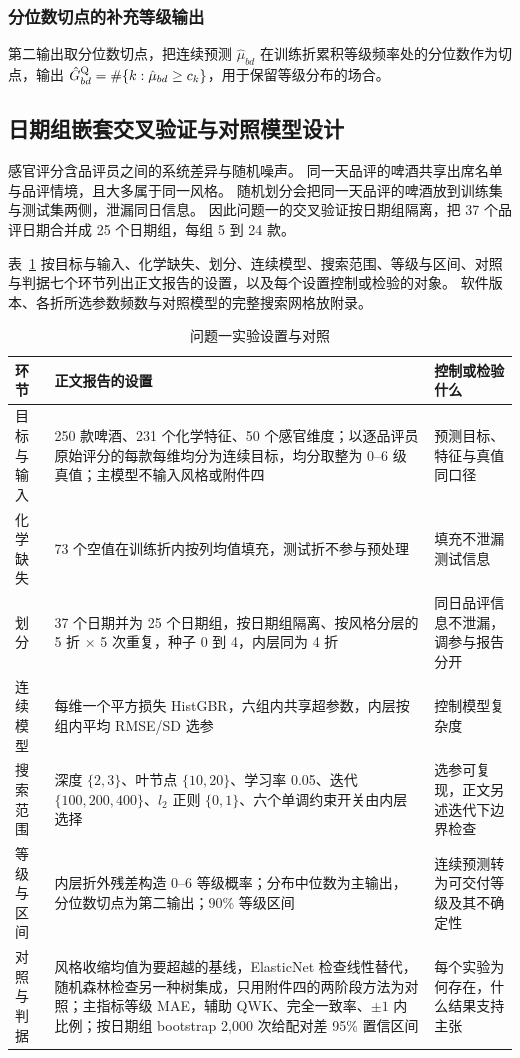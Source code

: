 \subsubsection{分位数切点的补充等级输出}

第二输出取分位数切点，把连续预测 $\hat\mu_{bd}$ 在训练折累积等级频率处的分位数作为切点，输出 $\hat G^{\rm Q}_{bd}=\#\{k:\hat\mu_{bd}\ge c_k\}$，用于保留等级分布的场合。

\subsection{日期组嵌套交叉验证与对照模型设计}

感官评分含品评员之间的系统差异与随机噪声。
同一天品评的啤酒共享出席名单与品评情境，且大多属于同一风格。
随机划分会把同一天品评的啤酒放到训练集与测试集两侧，泄漏同日信息。
因此问题一的交叉验证按日期组隔离，把 37 个品评日期合并成 25 个日期组，每组 5 到 24 款。

表~\ref{tab:q1-setup} 按目标与输入、化学缺失、划分、连续模型、搜索范围、等级与区间、对照与判据七个环节列出正文报告的设置，以及每个设置控制或检验的对象。
软件版本、各折所选参数频数与对照模型的完整搜索网格放附录。

\begin{table}[htbp]
\centering\small
\caption{问题一实验设置与对照}
\label{tab:q1-setup}
\begin{tabular}{p{3.0cm}p{5.4cm}p{4.2cm}}
\toprule
环节 & 正文报告的设置 & 控制或检验什么 \\
\midrule
目标与输入 & 250 款啤酒、231 个化学特征、50 个感官维度；以逐品评员原始评分的每款每维均分为连续目标，均分取整为 0--6 级真值；主模型不输入风格或附件四 & 预测目标、特征与真值同口径 \\
\addlinespace
化学缺失 & 73 个空值在训练折内按列均值填充，测试折不参与预处理 & 填充不泄漏测试信息 \\
\addlinespace
划分 & 37 个日期并为 25 个日期组，按日期组隔离、按风格分层的 5 折 $\times$ 5 次重复，种子 0 到 4，内层同为 4 折 & 同日品评信息不泄漏，调参与报告分开 \\
\addlinespace
连续模型 & 每维一个平方损失 HistGBR，六组内共享超参数，内层按组内平均 RMSE/SD 选参 & 控制模型复杂度 \\
\addlinespace
搜索范围 & 深度 $\{2,3\}$、叶节点 $\{10,20\}$、学习率 0.05、迭代 $\{100,200,400\}$、$l_2$ 正则 $\{0,1\}$、六个单调约束开关由内层选择 & 选参可复现，正文另述迭代下边界检查 \\
\addlinespace
等级与区间 & 内层折外残差构造 0--6 等级概率；分布中位数为主输出，分位数切点为第二输出；90\% 等级区间 & 连续预测转为可交付等级及其不确定性 \\
\addlinespace
对照与判据 & 风格收缩均值为要超越的基线，ElasticNet 检查线性替代，随机森林检查另一种树集成，只用附件四的两阶段方法为对照；主指标等级 MAE，辅助 QWK、完全一致率、$\pm1$ 内比例；按日期组 bootstrap 2,000 次给配对差 95\% 置信区间 & 每个实验为何存在，什么结果支持主张 \\
\bottomrule
\end{tabular}
\end{table}

